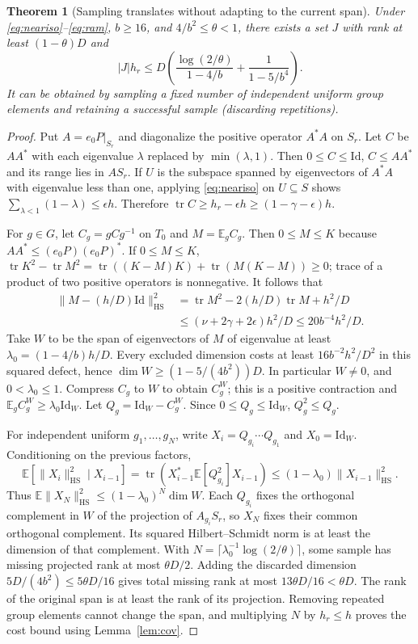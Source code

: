\documentclass[11pt]{article}
\newtheorem{theorem}{Theorem}[section]
\theoremstyle{remark}\newtheorem{remark}[theorem]{Remark}
\newcommand{\tr}{\operatorname{tr}}
\newcommand{\HS}{\mathrm{HS}}
\newcommand{\id}{\mathrm{Id}}
\newcommand{\E}{\mathbb E}
\begin{document}
\begin{theorem}[Sampling translates without adapting to the current span]\label{thm:random}
Under \eqref{eq:neariso}--\eqref{eq:ram}, $b\ge16$, and $4/b^2\le\theta<1$, there exists a set $J$ with rank at least $(1-\theta)D$ and
\[
|J|h_r\le D\left(\frac{\log(2/\theta)}{1-4/b}+\frac1{1-5/b^4}\right).
\]
It can be obtained by sampling a fixed number of independent uniform group elements and retaining a successful sample (discarding repetitions).
\end{theorem}
\begin{proof}
Put $A=e_0P|_{S_r}$ and diagonalize the positive operator $A^*A$ on $S_r$. Let $C$ be $AA^*$ with each eigenvalue $\lambda$ replaced by $\min(\lambda,1)$. Then $0\le C\le\id$, $C\le AA^*$ and its range lies in $A S_r$. If $U$ is the subspace spanned by eigenvectors of $A^*A$ with eigenvalue less than one, applying \eqref{eq:neariso} on $U\subseteq S$ shows $\sum_{\lambda<1}(1-\lambda)\le\epsilon h$. Therefore $\tr C\ge h_r-\epsilon h\ge(1-\gamma-\epsilon)h$.

For $g\in G$, let $C_g=gCg^{-1}$ on $T_0$ and $M=\E_g C_g$. Then $0\le M\le K$ because $AA^*\le(e_0P)(e_0P)^*$. If $0\le M\le K$, $\tr K^2-\tr M^2=\tr((K-M)K)+\tr(M(K-M))\ge0$; trace of a product of two positive operators is nonnegative. It follows that
\begin{align*}
\|M-(h/D)\id\|_{\HS}^2
&=\tr M^2-2(h/D)\tr M+h^2/D\\
&\le(\nu+2\gamma+2\epsilon)h^2/D\le20b^{-4}h^2/D.
\end{align*}
Take $W$ to be the span of eigenvectors of $M$ of eigenvalue at least $\lambda_0=(1-4/b)h/D$. Every excluded dimension costs at least $16b^{-2}h^2/D^2$ in this squared defect, hence $\dim W\ge(1-5/(4b^2))D$. In particular $W\ne0$, and $0<\lambda_0\le1$. Compress $C_g$ to $W$ to obtain $C_g^W$; this is a positive contraction and $\E_g C_g^W\ge\lambda_0\id_W$. Let $Q_g=\id_W-C_g^W$. Since $0\le Q_g\le\id_W$, $Q_g^2\le Q_g$.

For independent uniform $g_1,\ldots,g_N$, write $X_i=Q_{g_i}\cdots Q_{g_1}$ and $X_0=\id_W$. Conditioning on the previous factors,
\[
\E[\|X_i\|_{\HS}^2\mid X_{i-1}]
=\tr(X_{i-1}^*\E[Q_{g_i}^2]X_{i-1})\le(1-\lambda_0)\|X_{i-1}\|_{\HS}^2.
\]
Thus $\E\|X_N\|_{\HS}^2\le(1-\lambda_0)^N\dim W$. Each $Q_{g_i}$ fixes the orthogonal complement in $W$ of the projection of $A_{g_i}S_r$, so $X_N$ fixes their common orthogonal complement. Its squared Hilbert--Schmidt norm is at least the dimension of that complement. With $N=\lceil\lambda_0^{-1}\log(2/\theta)\rceil$, some sample has missing projected rank at most $\theta D/2$. Adding the discarded dimension $5D/(4b^2)\le5\theta D/16$ gives total missing rank at most $13\theta D/16<\theta D$. The rank of the original span is at least the rank of its projection. Removing repeated group elements cannot change the span, and multiplying $N$ by $h_r\le h$ proves the cost bound using Lemma~\ref{lem:cov}.
\end{proof}
\end{document}
